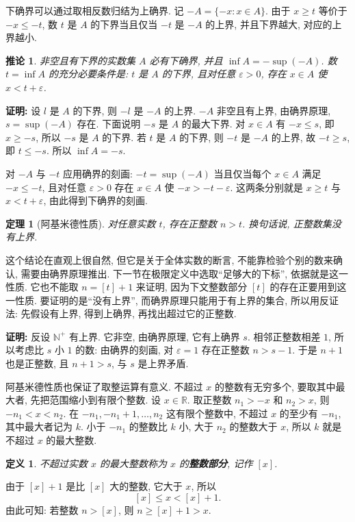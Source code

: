 \documentclass[UTF8,openany]{ctexbook}
\theoremstyle{chinesetextbook}
\newtheorem{definition}{定义}[section]
\newtheorem{theorem}{定理}[section]
\newenvironment{cnproof}{\par\indent\textbf{证明:} \ignorespaces}{\par}
\newtheorem*{corollarysingle}{推论}
\begin{document}
下确界可以通过取相反数归结为上确界. 记 $-A=\{-x:x\in A\}$. 由于 $x\ge t$ 等价于 $-x\le-t$, 数 $t$ 是 $A$ 的下界当且仅当 $-t$ 是 $-A$ 的上界, 并且下界越大, 对应的上界越小.
\begin{corollarysingle}
非空且有下界的实数集 $A$ 必有下确界, 并且 $\inf A=-\sup(-A)$. 数 $t=\inf A$ 的充分必要条件是: $t$ 是 $A$ 的下界, 且对任意 $\varepsilon>0$, 存在 $x\in A$ 使 $x<t+\varepsilon$.
\end{corollarysingle}
\begin{cnproof}
设 $l$ 是 $A$ 的下界, 则 $-l$ 是 $-A$ 的上界. $-A$ 非空且有上界, 由确界原理, $s=\sup(-A)$ 存在. 下面说明 $-s$ 是 $A$ 的最大下界. 对 $x\in A$ 有 $-x\le s$, 即 $x\ge-s$, 所以 $-s$ 是 $A$ 的下界. 若 $t$ 是 $A$ 的下界, 则 $-t$ 是 $-A$ 的上界, 故 $-t\ge s$, 即 $t\le-s$. 所以 $\inf A=-s$.

对 $-A$ 与 $-t$ 应用确界的刻画: $-t=\sup(-A)$ 当且仅当每个 $x\in A$ 满足 $-x\le-t$, 且对任意 $\varepsilon>0$ 存在 $x\in A$ 使 $-x>-t-\varepsilon$. 这两条分别就是 $x\ge t$ 与 $x<t+\varepsilon$, 由此得到下确界的刻画.
\end{cnproof}
\begin{theorem}[阿基米德性质]
对任意实数 $t$, 存在正整数 $n>t$. 换句话说, 正整数集没有上界.
\end{theorem}
这个结论在直观上很自然, 但它是关于全体实数的断言, 不能靠检验个别的数来确认, 需要由确界原理推出. 下一节在极限定义中选取“足够大的下标”, 依据就是这一性质. 它也不能取 $n=[t]+1$ 来证明, 因为下文整数部分 $[t]$ 的存在正要用到这一性质. 要证明的是“没有上界”, 而确界原理只能用于有上界的集合, 所以用反证法: 先假设有上界, 得到上确界, 再找出超过它的正整数.
\begin{cnproof}
反设 $\mathbb N^+$ 有上界. 它非空, 由确界原理, 它有上确界 $s$. 相邻正整数相差 $1$, 所以考虑比 $s$ 小 $1$ 的数: 由确界的刻画, 对 $\varepsilon=1$ 存在正整数 $n>s-1$. 于是 $n+1$ 也是正整数, 且 $n+1>s$, 与 $s$ 是上界矛盾.
\end{cnproof}
阿基米德性质也保证了取整运算有意义. 不超过 $x$ 的整数有无穷多个, 要取其中最大者, 先把范围缩小到有限个整数. 设 $x\in\mathbb R$. 取正整数 $n_1>-x$ 和 $n_2>x$, 则 $-n_1<x<n_2$. 在 $-n_1,-n_1+1,\ldots,n_2$ 这有限个整数中, 不超过 $x$ 的至少有 $-n_1$, 其中最大者记为 $k$. 小于 $-n_1$ 的整数比 $k$ 小, 大于 $n_2$ 的整数大于 $x$, 所以 $k$ 就是不超过 $x$ 的最大整数.
\begin{definition}
不超过实数 $x$ 的最大整数称为 $x$ 的\textbf{整数部分}, 记作 $[x]$.
\end{definition}
由于 $[x]+1$ 是比 $[x]$ 大的整数, 它大于 $x$, 所以
\[
[x]\le x<[x]+1.
\]
由此可知: 若整数 $n>[x]$, 则 $n\ge[x]+1>x$.
\end{document}
